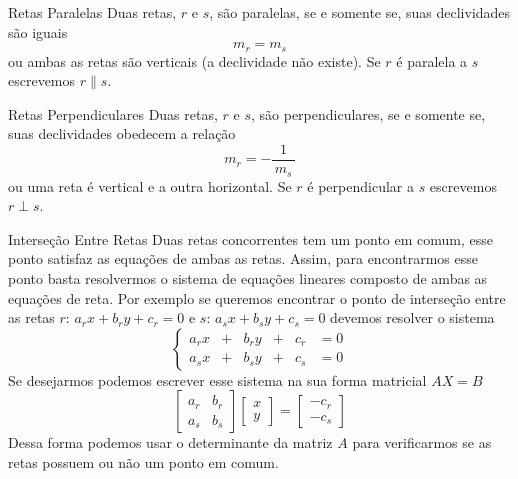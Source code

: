 \begin{teoria}{Retas Paralelas}
    Duas retas, $r$ e $s$, são paralelas, se e somente se, suas declividades são iguais 
    \[ m_r = m_s \]
    ou ambas as retas são verticais (a declividade não existe). 
    Se $r$ é paralela a $s$ escrevemos $r\parallel s$.
\end{teoria}

\begin{teoria}{Retas Perpendiculares}
    Duas retas, $r$ e $s$, são perpendiculares, se e somente se, suas declividades obedecem a relação
    \[ m_r = -\frac{1}{\,m_s\,}\]
    ou uma reta é vertical e a outra horizontal.  
    Se $r$ é perpendicular a $s$ escrevemos $r\perp s$.
\end{teoria}

\begin{teoria}{Interseção Entre Retas}
    Duas retas concorrentes tem um ponto em comum, esse ponto satisfaz as equações de ambas as retas.
    Assim, para encontrarmos esse ponto basta resolvermos o sistema de equações lineares
    composto de ambas as equações de reta. Por exemplo se queremos encontrar o ponto de interseção 
    entre as retas $r\!:\, a_r x + b_r y + c_r = 0$ e $s\!:\, a_s x + b_s y + c_s = 0$
    devemos resolver o sistema 
    \[\left\{
        \begin{array}{lclcll}
        a_r x & + & b_r y & + & c_r & = 0 \\
        a_s x & + & b_s y & + & c_s & = 0 
        \end{array}
    \right.
    \]
    Se desejarmos podemos escrever esse sistema na sua forma matricial $AX=B$
    \[
        \left[
        \begin{array}{ll}
            a_r & b_r \\
            a_s & b_s 
        \end{array}
        \right]
        \left[
        \begin{array}{c} x \\ y \end{array}
        \right]
        =
        \left[
        \begin{array}{l} -c_r \\ -c_s \end{array}
        \right]
    \]
    Dessa forma podemos usar o determinante da matriz $A$ para verificarmos se as retas possuem ou não um ponto em comum.
\end{teoria}

